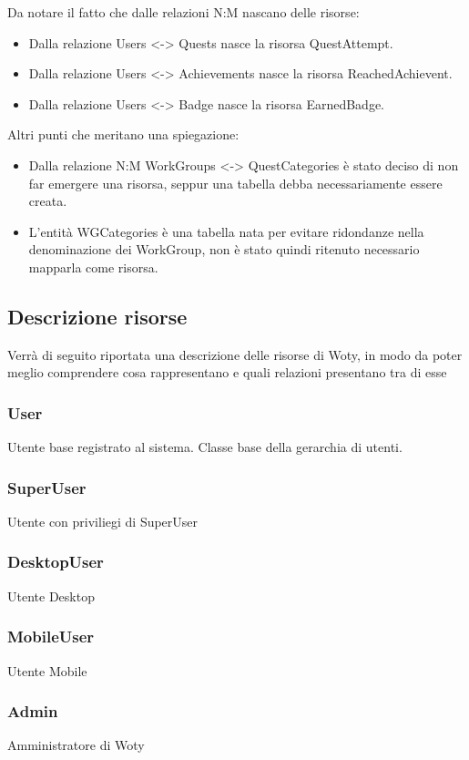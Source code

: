 {{Da notare il fatto che dalle relazioni N:M nascano delle risorse:

\begin{itemize}
	\item Dalla relazione Users <-> Quests nasce la risorsa QuestAttempt.
	\item Dalla relazione Users <-> Achievements nasce la risorsa ReachedAchievent.
	\item Dalla relazione Users <-> Badge nasce la risorsa EarnedBadge.
\end{itemize}

Altri punti che meritano una spiegazione:

\begin{itemize}
	\item Dalla relazione N:M WorkGroups <-> QuestCategories è stato deciso di non far emergere una risorsa, seppur una tabella debba necessariamente essere creata.
	\item L'entità WGCategories è una tabella nata per evitare ridondanze nella denominazione dei WorkGroup, non è stato quindi ritenuto necessario mapparla come risorsa.
\end{itemize}

\subsection{Descrizione risorse}
Verrà di seguito riportata una descrizione delle risorse di Woty, in modo da poter meglio comprendere cosa rappresentano e quali relazioni presentano tra di esse

\subsubsection{User} Utente base registrato al sistema. Classe base della gerarchia di utenti.
\subsubsection{SuperUser} Utente con priviliegi di SuperUser
\subsubsection{DesktopUser} Utente Desktop
\subsubsection{MobileUser} Utente Mobile
\subsubsection{Admin} Amministratore di Woty
}}
